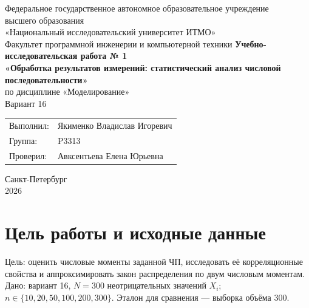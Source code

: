 \documentclass[12pt,a4paper]{article}
\begin{document}
\begin{titlepage}
\centering
Федеральное государственное автономное образовательное учреждение\\
высшего образования\\
«Национальный исследовательский университет ИТМО»\\[5mm]
Факультет программной инженерии и компьютерной техники
\vfill
{\large\bfseries Учебно-исследовательская работа № 1}\\[5mm]
{\large\bfseries «Обработка результатов измерений: статистический анализ числовой последовательности»}\\[5mm]
по дисциплине «Моделирование»\\[3mm]
Вариант 16
\vfill
\begin{flushright}
\begin{tabular}{ll}
Выполнил: & Якименко Владислав Игоревич\\
Группа: & P3313\\
Проверил: & Авксентьева Елена Юрьевна
\end{tabular}
\end{flushright}
\vfill
Санкт-Петербург\\2026
\end{titlepage}
\setcounter{page}{2}
\section{Цель работы и исходные данные}
Цель: оценить числовые моменты заданной ЧП, исследовать её корреляционные свойства и аппроксимировать закон распределения по двум числовым моментам.
Дано: вариант 16, $N=300$ неотрицательных значений $X_i$;
$n\in\{10,20,50,100,200,300\}$. Эталон для сравнения --- выборка объёма $300$.
\end{document}
